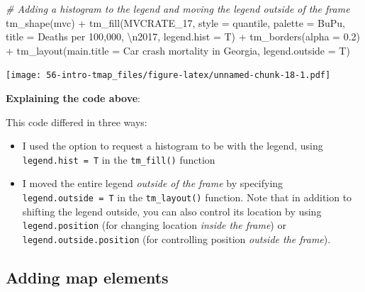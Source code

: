 \documentclass[
]{book}
\newenvironment{Shaded}{\begin{snugshade}}{\end{snugshade}}
\newcommand{\AttributeTok}[1]{\textcolor[rgb]{0.77,0.63,0.00}{#1}}
\newcommand{\CommentTok}[1]{\textcolor[rgb]{0.56,0.35,0.01}{\textit{#1}}}
\newcommand{\FloatTok}[1]{\textcolor[rgb]{0.00,0.00,0.81}{#1}}
\newcommand{\FunctionTok}[1]{\textcolor[rgb]{0.00,0.00,0.00}{#1}}
\newcommand{\NormalTok}[1]{#1}
\newcommand{\SpecialCharTok}[1]{\textcolor[rgb]{0.00,0.00,0.00}{#1}}
\newcommand{\StringTok}[1]{\textcolor[rgb]{0.31,0.60,0.02}{#1}}
\providecommand{\tightlist}{%
  \setlength{\itemsep}{0pt}\setlength{\parskip}{0pt}}
\begin{document}
\begin{Shaded}
\begin{Highlighting}[]
\CommentTok{\# Adding a histogram to the legend and moving the legend outside of the frame}
\FunctionTok{tm\_shape}\NormalTok{(mvc) }\SpecialCharTok{+}
  \FunctionTok{tm\_fill}\NormalTok{(}\StringTok{\textquotesingle{}MVCRATE\_17\textquotesingle{}}\NormalTok{,}
          \AttributeTok{style =} \StringTok{\textquotesingle{}quantile\textquotesingle{}}\NormalTok{,}
          \AttributeTok{palette =} \StringTok{\textquotesingle{}BuPu\textquotesingle{}}\NormalTok{,}
          \AttributeTok{title =} \StringTok{\textquotesingle{}Deaths per 100,000, }\SpecialCharTok{\textbackslash{}n}\StringTok{2017\textquotesingle{}}\NormalTok{,}
          \AttributeTok{legend.hist =}\NormalTok{ T) }\SpecialCharTok{+}
  \FunctionTok{tm\_borders}\NormalTok{(}\AttributeTok{alpha =} \FloatTok{0.2}\NormalTok{) }\SpecialCharTok{+}
  \FunctionTok{tm\_layout}\NormalTok{(}\AttributeTok{main.title =} \StringTok{\textquotesingle{}Car crash mortality in Georgia\textquotesingle{}}\NormalTok{,}
            \AttributeTok{legend.outside =}\NormalTok{ T)}
\end{Highlighting}
\end{Shaded}

\texttt{[image: 56-intro-tmap\_files/figure-latex/unnamed-chunk-18-1.pdf]}

\textbf{Explaining the code above}:

This code differed in three ways:

\begin{itemize}
\tightlist
\item
  I used the option to request a histogram to be with the legend, using \texttt{legend.hist\ =\ T} in the \texttt{tm\_fill()} function
\item
  I moved the entire legend \emph{outside of the frame} by specifying \texttt{legend.outside\ =\ T} in the \texttt{tm\_layout()} function. Note that in addition to shifting the legend outside, you can also control its location by using \texttt{legend.position} (for changing location \emph{inside the frame}) or \texttt{legend.outside.position} (for controlling position \emph{outside the frame}).
\end{itemize}

\hypertarget{adding-map-elements}{%
\subsection{Adding map elements}\label{adding-map-elements}}
\end{document}
